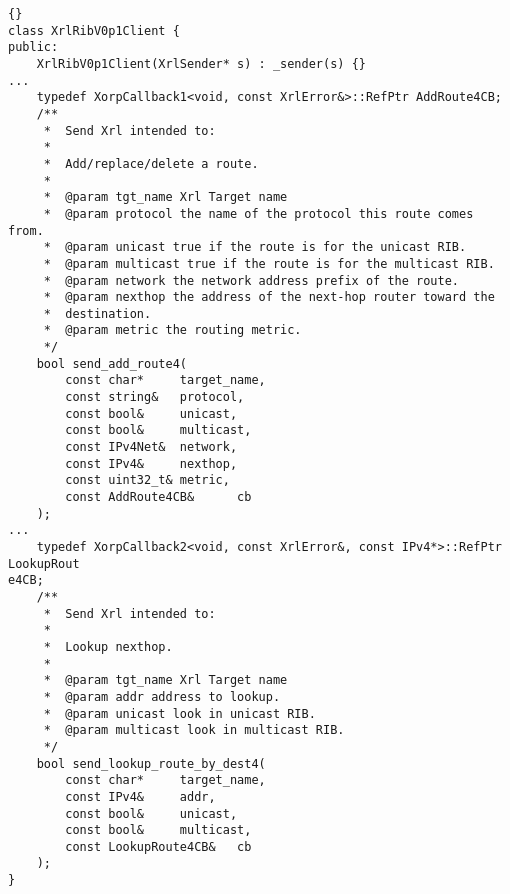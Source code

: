 \documentclass[11pt]{article}
\newcommand{\stt}{\tt\small}
\begin{document}
\begin{lstlisting}[caption={Extracts from {\stt xorp/xrl/interfaces/rib\_xif.hh} %
                                     \label{lst:ribxif.hh} } ]{}
class XrlRibV0p1Client {
public:
    XrlRibV0p1Client(XrlSender* s) : _sender(s) {}
...
    typedef XorpCallback1<void, const XrlError&>::RefPtr AddRoute4CB;
    /**
     *  Send Xrl intended to:
     *
     *  Add/replace/delete a route.
     *
     *  @param tgt_name Xrl Target name
     *  @param protocol the name of the protocol this route comes from.
     *  @param unicast true if the route is for the unicast RIB.
     *  @param multicast true if the route is for the multicast RIB.
     *  @param network the network address prefix of the route.
     *  @param nexthop the address of the next-hop router toward the
     *  destination.
     *  @param metric the routing metric.
     */
    bool send_add_route4(
        const char*     target_name,
        const string&   protocol,
        const bool&     unicast,
        const bool&     multicast,
        const IPv4Net&  network,
        const IPv4&     nexthop,
        const uint32_t& metric,
        const AddRoute4CB&      cb
    );
...
    typedef XorpCallback2<void, const XrlError&, const IPv4*>::RefPtr LookupRout
e4CB;
    /**
     *  Send Xrl intended to:
     *
     *  Lookup nexthop.
     *
     *  @param tgt_name Xrl Target name
     *  @param addr address to lookup.
     *  @param unicast look in unicast RIB.
     *  @param multicast look in multicast RIB.
     */
    bool send_lookup_route_by_dest4(
        const char*     target_name,
        const IPv4&     addr,
        const bool&     unicast,
        const bool&     multicast,
        const LookupRoute4CB&   cb
    );
}
\end{lstlisting}
\newpage
\end{document}
